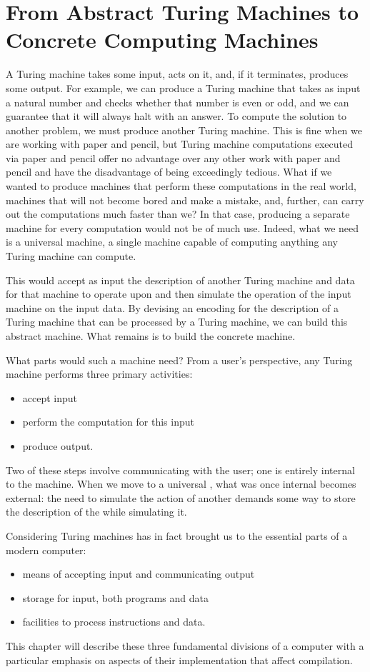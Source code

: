 \label{background:computers}
\section{From Abstract Turing Machines to Concrete Computing Machines}
A Turing machine takes some input, acts on it, and, if it terminates, produces some output. For example, we can produce a Turing machine that takes as input a natural number and checks whether that number is even or odd, and we can guarantee that it will always halt with an answer. To compute the solution to another problem, we must produce another Turing machine. This is fine when we are working with paper and pencil, but Turing machine computations executed via paper and pencil offer no advantage over any other work with paper and pencil and have the disadvantage of being exceedingly tedious. What if we wanted to produce machines that perform these computations in the real world, machines that will not become bored and make a mistake, and, further, can carry out the computations much faster than we? In that case, producing a separate machine for every computation would not be of much use. Indeed, what we need is a universal machine, a single machine capable of computing anything any Turing machine can compute.

This  would accept as input the description of another Turing machine and data for that machine to operate upon and then simulate the operation of the input machine on the input data. By devising an encoding for the description of a Turing machine that can be processed by a Turing machine, we can build this abstract machine. What remains is to build the concrete machine.

What parts would such a machine need? From a user's perspective, any Turing machine performs three primary activities:
\begin{itemize}
\item accept input
\item perform the computation for this input
\item produce output.
\end{itemize}
Two of these steps involve communicating with the user; one is entirely internal to the machine. When we move to a universal \TM, what was once internal becomes external: the need to simulate the action of another \TM demands some way to store the description of the \TM while simulating it.

Considering Turing machines has in fact brought us to the essential parts of a modern computer:
\begin{itemize}
\item means of accepting input and communicating output
\item storage for input, both programs and data
\item facilities to process instructions and data.
\end{itemize}
This chapter will describe these three fundamental divisions of a computer with a particular emphasis on aspects of their implementation that affect compilation.

